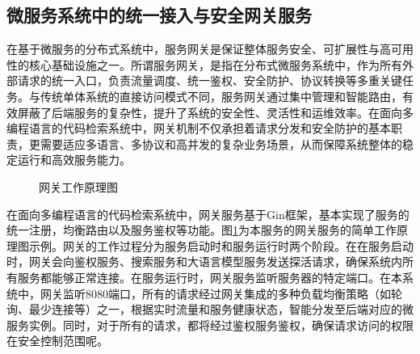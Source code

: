 \documentclass[UTF8,a4paper,12pt]{ctexart}
\numberwithin{equation}{section}
\begin{document}
\subsection{微服务系统中的统一接入与安全网关服务}
在基于微服务的分布式系统中，服务网关是保证整体服务安全、可扩展性与高可用性的核心基础设施之一。所谓服务网关，是指在分布式微服务系统中，作为所有外部请求的统一入口，负责流量调度、统一鉴权、安全防护、协议转换等多重关键任务。与传统单体系统的直接访问模式不同，服务网关通过集中管理和智能路由，有效屏蔽了后端服务的复杂性，提升了系统的安全性、灵活性和运维效率。在面向多编程语言的代码检索系统中，网关机制不仅承担着请求分发和安全防护的基本职责，更需要适应多语言、多协议和高并发的复杂业务场景，从而保障系统整体的稳定运行和高效服务能力。\par
\begin{figure}[H]
	\caption{网关工作原理图}
	\label{gateway}
\end{figure}
在面向多编程语言的代码检索系统中，网关服务基于Gin框架，基本实现了服务的统一注册，均衡路由以及服务鉴权等功能。图\ref{gateway}为本服务的网关服务的简单工作原理图示例。网关的工作过程分为服务启动时和服务运行时两个阶段。在在服务启动时，网关会向鉴权服务、搜索服务和大语言模型服务发送探活请求，确保系统内所有服务都能够正常连接。在服务运行时，网关服务监听服务器的特定端口。在本系统中，网关监听8080端口，所有的请求经过网关集成的多种负载均衡策略（如轮询、最少连接等）之一，根据实时流量和服务健康状态，智能分发至后端对应的微服务实例。同时，对于所有的请求，都将经过鉴权服务鉴权，确保请求访问的权限在安全控制范围呢。\par
\end{document}
